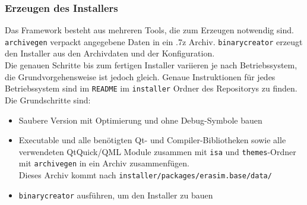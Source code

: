 \subsubsection{Erzeugen des Installers}
Das Framework besteht aus mehreren Tools, die zum Erzeugen notwendig sind. \texttt{archivegen} verpackt angegebene Daten in ein .7z Archiv. \texttt{binarycreator} erzeugt den Installer aus den Archivdaten und der Konfiguration.\\
Die genauen Schritte bis zum fertigen Installer variieren je nach Betriebssystem, die Grundvorgehensweise ist jedoch gleich. Genaue Instruktionen für jedes Betriebssystem sind im \texttt{README} im \texttt{installer} Ordner des Repositorys zu finden.
Die Grundschritte sind:
\begin{itemize}
	\item Saubere Version mit Optimierung und ohne Debug-Symbole bauen
	\item Executable und alle benötigten Qt- und Compiler-Bibliotheken sowie alle verwendeten QtQuick/QML Module zusammen mit \texttt{isa} und \texttt{themes}-Ordner mit \texttt{archivegen} in ein Archiv zusammenfügen.\\
	Dieses Archiv kommt nach \texttt{installer/packages/erasim.base/data/}
	\item \texttt{binarycreator} ausführen, um den Installer zu bauen 
\end{itemize}